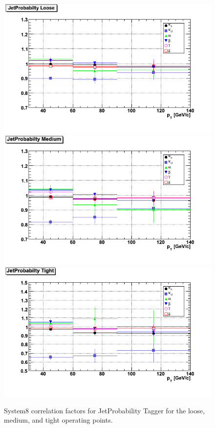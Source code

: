 \begin{figure}[htbp]
  \begin{center}
    \includegraphics[width=120mm]{Figures/JPL_correlations_ppmux.png}
    \includegraphics[width=120mm]{Figures/JPM_correlations_ppmux.png}
    \includegraphics[width=120mm]{Figures/JPT_correlations_ppmux.png}
  \end{center}
  \caption{System8 correlation factors for JetProbability Tagger for the loose, medium, and tight operating points.}
  \label{fig:correlation_TP}
\end{figure}


